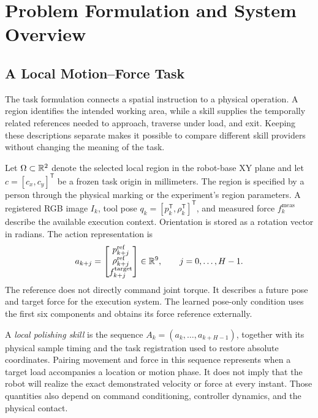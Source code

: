 \chapter{Problem Formulation and System Overview}
\label{chap:faire_overview}

\section{A Local Motion--Force Task}
The task formulation connects a spatial instruction to a physical operation. A region identifies the intended working area, while a skill supplies the temporally related references needed to approach, traverse under load, and exit. Keeping these descriptions separate makes it possible to compare different skill providers without changing the meaning of the task.

Let \(\Omega\subset\mathbb{R}^2\) denote the selected local region in the robot-base XY plane and let \(c=[c_x,c_y]^\mathsf{T}\) be a frozen task origin in millimeters. The region is specified by a person through the physical marking or the experiment's region parameters. A registered RGB image \(I_k\), tool pose \(q_k=[p_k^\mathsf{T},\rho_k^\mathsf{T}]^\mathsf{T}\), and measured force \(f_k^{\mathrm{meas}}\) describe the available execution context. Orientation is stored as a rotation vector in radians. The action representation is
\begin{equation}
 a_{k+j}=\begin{bmatrix}p_{k+j}^{\mathrm{ref}}\\\rho_{k+j}^{\mathrm{ref}}\\f_{k+j}^{\mathrm{target}}\end{bmatrix}\in\mathbb{R}^9,
 \qquad j=0,\ldots,H-1.
 \label{eq:motion_force_prediction}
\end{equation}
The reference does not directly command joint torque. It describes a future pose and target force for the execution system. The learned pose-only condition uses the first six components and obtains its force reference externally.

A \emph{local polishing skill} is the sequence \(A_k=(a_k,\ldots,a_{k+H-1})\), together with its physical sample timing and the task registration used to restore absolute coordinates. Pairing movement and force in this sequence represents when a target load accompanies a location or motion phase. It does not imply that the robot will realize the exact demonstrated velocity or force at every instant. Those quantities also depend on command conditioning, controller dynamics, and the physical contact.

